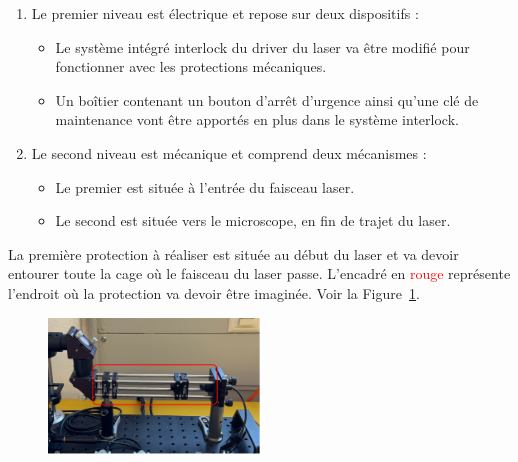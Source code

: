 \begin{enumerate}
    \item Le premier niveau est électrique et repose sur deux dispositifs :
          \begin{itemize}[label=\textbullet]
              \item Le système intégré interlock du driver du laser va être modifié pour fonctionner avec les protections mécaniques.
              \item Un boîtier contenant un bouton d'arrêt d'urgence ainsi qu'une clé de maintenance vont être apportés en plus dans le système interlock.
          \end{itemize}
    \item Le second niveau est mécanique et comprend deux mécanismes :
          \begin{itemize}[label=\textbullet]
              \item Le premier est située à l'entrée du faisceau laser.
              \item Le second est située vers le microscope, en fin de trajet du laser.
          \end{itemize}
\end{enumerate}
\begin{minipage}{\textwidth}
    La première protection à réaliser est située au début du laser et va devoir entourer toute la cage où le faisceau du laser passe. L'encadré en \textcolor{red}{rouge} représente l'endroit où la protection va devoir être imaginée. Voir la Figure~\ref{protection_laser_début}.

    \begin{figure}[H]
        \begin{center}
            \includegraphics[width=0.5\textwidth]{assets/figures/Introduction/protection_debut_laser.png}
        \end{center}
        \label{protection_laser_début}
    \end{figure}
\end{minipage}

